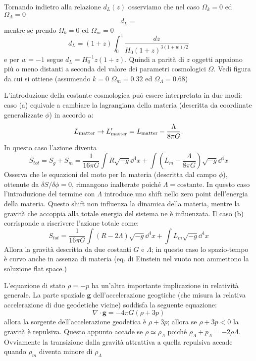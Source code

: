 Tornando indietro alla relazione $d_L(z)$ osserviamo che nel caso $\Omega_{k}=0$
ed $\Omega_{\Lambda}=0$
\begin{equation}
d_L =
\end{equation}
mentre se prendo $\Omega_{k}=0$ ed  $\Omega_{m}=0$
\begin{equation}
d_L = (1+z) \int_0^z \frac{dz}{H_0 (1+z)^{3(1+w)/2}}
\end{equation}
e per $w=-1$ segue $d_L=H_0^{-1} z (1+z)$. Quindi a parità di $z$ oggetti
appaiono più o meno distanti a seconda del valore dei parametri cosmologici
$\Omega$.  Vedi figura da cui si ottiene (assumendo $k=0$ $\Omega_{m}=0.32$ ed
$\Omega_{\Lambda}=0.68$)

L'introduzione della costante cosmologica pu\'o essere interpretata in due modi:
caso (a) equivale a cambiare la lagrangiana della materia (descritta da
coordinate generalizzate $\phi$) in accordo a:
\begin{equation}
  L_{\textup{matter}} \to L'_{\textup{matter}} = L_{\textup{matter}} - \frac{\Lambda}{8 \pi G}.
\end{equation}
In questo caso l'azione diventa
\begin{equation}
  S_{tot}=S_{g}+S_{m}= \frac {1}{16 \pi G}
  \int R \sqrt{-g} \dd^4x + \int \left( L_{m}- \frac {\Lambda}{8 \pi G} \right) \sqrt{-g} \dd^4 x
\end{equation}
Osserva che le equazioni del moto per la materia (descritta dal campo $\phi$),
ottenute da $\delta S/\delta \phi=0$, rimangono inalterate poiché
$\Lambda=\text{costante}$.  In questo caso l'introduzione del termine con
$\Lambda$ introduce uno shift nello zero point dell'energia della materia.
Questo shift non influenza la dinamica della materia, mentre la gravità che
accoppia alla totale energia del sistema ne è influenzata.  Il caso (b)
corrisponde a riscrivere l'azione totale come:
\begin{equation}
  S_{tot}= \frac {1}{16 \pi G}
  \int (R-2\Lambda)  \sqrt{-g} \dd^4x + \int  L_{m} \sqrt{-g} \dd^4 x
\end{equation}
Allora la gravità descritta da due costanti $G$ e $\Lambda$; in questo caso lo
spazio-tempo è curvo anche in assenza di materia (eq. di Einstein nel vuoto non
ammettono la soluzione flat space.)

L'equazione di stato $\rho=-p$ ha un'altra importante implicazione in relatività
generale.  La parte spaziale $\bm{g}$ dell'accelerazione geogtiche (che misura
la relativa accelerazione di due geodetiche vicine) soddisfa la seguente
equazione:
\begin{equation}
  \nabla \cdot \bm{g} = - 4 \pi G (\rho+3p)
\end{equation}
allora la sorgente dell'accelerazione geodetica è $\rho+3p$; allora se
$\rho+3p<0$ la gravità è repulsiva.  Questo appunto accade se
$\rho \simeq \rho_{\Lambda}$ poiché
$\rho_{\Lambda}+p_{\Lambda}= -2 \rho{\Lambda}$.  Ovviamente la transizione dalla
gravità attrattiva a quella repulsiva accade quando $\rho_m$ diventa minore di
$\rho_{\Lambda}$

